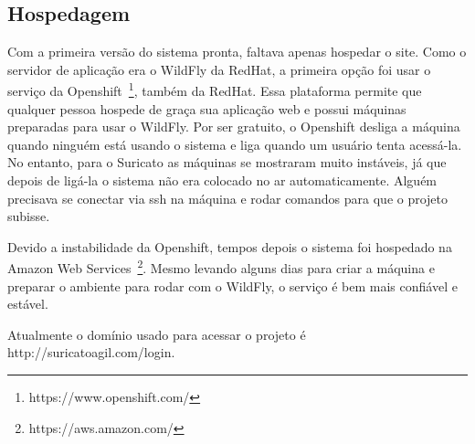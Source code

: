 \subsection{Hospedagem}

Com a primeira versão do sistema pronta, faltava apenas hospedar o site. Como o servidor de aplicação era o WildFly da RedHat, a primeira opção foi usar o serviço da Openshift~\footnote{https://www.openshift.com/}, também da RedHat. Essa plataforma permite que qualquer pessoa hospede de graça sua aplicação web e possui máquinas preparadas para usar o WildFly. Por ser gratuito, o Openshift desliga a máquina quando ninguém está usando o sistema e liga quando um usuário tenta acessá-la. No entanto, para o Suricato as máquinas se mostraram muito instáveis, já que depois de ligá-la o sistema não era colocado no ar automaticamente. Alguém precisava se conectar via ssh na máquina e rodar comandos para que o projeto subisse.

Devido a instabilidade da Openshift, tempos depois o sistema foi hospedado na Amazon Web Services~\footnote{https://aws.amazon.com/}. Mesmo levando alguns dias para criar a máquina e preparar o ambiente para rodar com o WildFly, o serviço é bem mais confiável e estável.

Atualmente o domínio usado para acessar o projeto é http://suricatoagil.com/login.